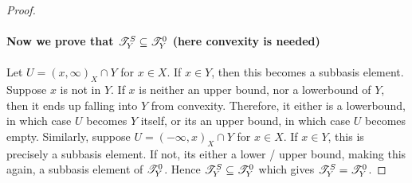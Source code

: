 \documentclass[main.tex]{subfiles}
\begin{document}
{\begin{proof}
    \\\\ \textbf{Now we prove that $\mathscr T^S_Y \subseteq \mathscr T^0_Y$ (here convexity is needed) }
    \\\\ Let $U=(x,\infty)_X\cap Y$ for $x \in X$. If $x \in Y$, then this becomes a subbasis element. Suppose $x$ is not in $Y$. If $x$ is neither an upper bound, nor a lowerbound of $Y$, then it ends up falling into $Y$ from convexity. Therefore, it either is a lowerbound, in which case $U$ becomes $Y$ itself, or its an upper bound, in which case $U$ becomes empty. Similarly, suppose $U=(-\infty,x)_X \cap Y$ for $x \in X$. If $x \in Y$, this is precisely a subbasis element. If not, its either a lower / upper bound, making this again, a subbasis element of $\mathscr T^0_Y$. Hence $\mathscr T^S_Y \subseteq \mathscr T^0_Y$ which gives $\mathscr T^S_Y =\mathscr T^0_Y$.
    
    
    \end{proof}
} 
\end{document}
